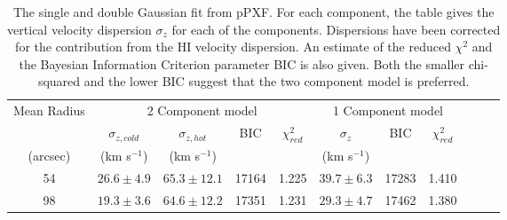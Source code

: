\documentclass[fleqn,usenatbib]{mnras}
\newcommand{\kms}{km s$^{-1}$}
\begin{document}
\begin{table} %
\begin{tabular}{ccccccccccc}
\hline
Mean Radius  & \multicolumn{4}{c}{2 Component model}                       & \multicolumn{3}{c}{1 Component model} \\
            & $\sigma_{z,cold}$ & $\sigma_{z,hot}$ & BIC & $\chi^2_{red}$ & $\sigma_z$   & BIC  & $\chi^2_{red}$  \\
(arcsec)    & (\kms)            & (\kms)     &                   &     &           (\kms)               &     &                &       &      &                 \\
\hline
54          &        $26.6 \pm 4.9$           &     $65.3 \pm 12.1$             &        17164            &  1.225   &       $39.7 \pm 6.3$            &               17283 &       1.410                     \\
98          &     $19.3 \pm 3.6$              &       $64.6 \pm 12.2$           &      17351            &  1.231  &       $29.3 \pm  4.7$ &               17462 &       1.380                       \\
\hline
\end{tabular}
\caption[The single and double Gaussian fit from pPXF for NGC 6946.]{The single and double Gaussian fit from pPXF. For each component, the table gives the vertical velocity dispersion $\sigma_z$ for each of the components. Dispersions have been corrected for the contribution from the HI velocity dispersion. An estimate of the reduced $\chi ^2$ and the Bayesian Information Criterion parameter BIC is also given. Both the smaller chi-squared and the lower BIC suggest that the two component model is preferred.}
\label{VW_N6946}
\end{table}
\end{document}
